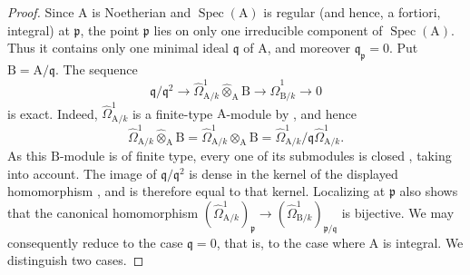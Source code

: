 \begin{proof}
Since $\mathrm{A}$ is Noetherian and $\operatorname{Spec}(\mathrm{A})$ is regular (and hence, a fortiori, integral) at $\mathfrak{p}$, the point $\mathfrak{p}$ lies on only one irreducible component of $\operatorname{Spec}(\mathrm{A})$. Thus it contains only one minimal ideal $\mathfrak{q}$ of $\mathrm{A}$, and moreover $\mathfrak{q}_{\mathfrak{p}}=0$. Put $\mathrm{B}=\mathrm{A}/\mathfrak{q}$. The sequence 
\[
  \mathfrak{q}/\mathfrak{q}^2\longrightarrow
  \hat{\Omega}^1_{\mathrm{A}/k}\widehat{\otimes}_{\mathrm{A}}\mathrm{B}
  \longrightarrow\hat{\Omega}^1_{\mathrm{B}/k}\longrightarrow0
\]
is exact. Indeed, $\hat{\Omega}^1_{\mathrm{A}/k}$ is a finite-type $\mathrm{A}$-module by , and hence
\[
  \hat{\Omega}^1_{\mathrm{A}/k}\widehat{\otimes}_{\mathrm{A}}\mathrm{B}
  =\hat{\Omega}^1_{\mathrm{A}/k}\otimes_{\mathrm{A}}\mathrm{B}
  =\hat{\Omega}^1_{\mathrm{A}/k}/\mathfrak{q}\hat{\Omega}^1_{\mathrm{A}/k}.
\]
As this $\mathrm{B}$-module is of finite type, every one of its submodules is closed , taking  into account. The image of $\mathfrak{q}/\mathfrak{q}^2$ is dense in the kernel of the displayed homomorphism , and is therefore equal to that kernel. Localizing at $\mathfrak{p}$ also shows that the canonical homomorphism $(\hat{\Omega}^1_{\mathrm{A}/k})_{\mathfrak{p}}\to(\hat{\Omega}^1_{\mathrm{B}/k})_{\mathfrak{p}/\mathfrak{q}}$ is bijective. We may consequently reduce to the case $\mathfrak{q}=0$, that is, to the case where $\mathrm{A}$ is integral. We distinguish two cases.


\end{proof}
